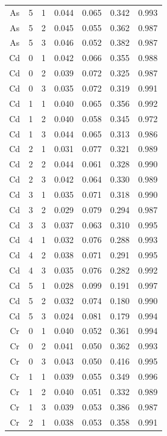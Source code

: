 \documentclass[ms, hidelinks]{uncgdissertationexp}
\theoremstyle{plain}
\theoremstyle{definition}
\theoremstyle{remark}
\begin{document}
\begin{longtable}{ccccccc}
As & 5 & 1 & 0.044 & 0.065 & 0.342 & 0.993\\
\rowcolor{gray!6}  As & 5 & 2 & 0.045 & 0.055 & 0.362 & 0.987\\
As & 5 & 3 & 0.046 & 0.052 & 0.382 & 0.987\\
\rowcolor{gray!6}  Cd & 0 & 1 & 0.042 & 0.066 & 0.355 & 0.988\\
Cd & 0 & 2 & 0.039 & 0.072 & 0.325 & 0.987\\
\rowcolor{gray!6}  Cd & 0 & 3 & 0.035 & 0.072 & 0.319 & 0.991\\
Cd & 1 & 1 & 0.040 & 0.065 & 0.356 & 0.992\\
\rowcolor{gray!6}  Cd & 1 & 2 & 0.040 & 0.058 & 0.345 & 0.972\\
Cd & 1 & 3 & 0.044 & 0.065 & 0.313 & 0.986\\
\rowcolor{gray!6}  Cd & 2 & 1 & 0.031 & 0.077 & 0.321 & 0.989\\
Cd & 2 & 2 & 0.044 & 0.061 & 0.328 & 0.990\\
\rowcolor{gray!6}  Cd & 2 & 3 & 0.042 & 0.064 & 0.330 & 0.989\\
Cd & 3 & 1 & 0.035 & 0.071 & 0.318 & 0.990\\
\rowcolor{gray!6}  Cd & 3 & 2 & 0.029 & 0.079 & 0.294 & 0.987\\
Cd & 3 & 3 & 0.037 & 0.063 & 0.310 & 0.995\\
\rowcolor{gray!6}  Cd & 4 & 1 & 0.032 & 0.076 & 0.288 & 0.993\\
Cd & 4 & 2 & 0.038 & 0.071 & 0.291 & 0.995\\
\rowcolor{gray!6}  Cd & 4 & 3 & 0.035 & 0.076 & 0.282 & 0.992\\
Cd & 5 & 1 & 0.028 & 0.099 & 0.191 & 0.997\\
\rowcolor{gray!6}  Cd & 5 & 2 & 0.032 & 0.074 & 0.180 & 0.990\\
Cd & 5 & 3 & 0.024 & 0.081 & 0.179 & 0.994\\
\rowcolor{gray!6}  Cr & 0 & 1 & 0.040 & 0.052 & 0.361 & 0.994\\
Cr & 0 & 2 & 0.041 & 0.050 & 0.362 & 0.993\\
\rowcolor{gray!6}  Cr & 0 & 3 & 0.043 & 0.050 & 0.416 & 0.995\\
Cr & 1 & 1 & 0.039 & 0.055 & 0.349 & 0.996\\
\rowcolor{gray!6}  Cr & 1 & 2 & 0.040 & 0.051 & 0.332 & 0.989\\
Cr & 1 & 3 & 0.039 & 0.053 & 0.386 & 0.987\\
\rowcolor{gray!6}  Cr & 2 & 1 & 0.038 & 0.053 & 0.358 & 0.991\\

\end{longtable}
\end{document}
